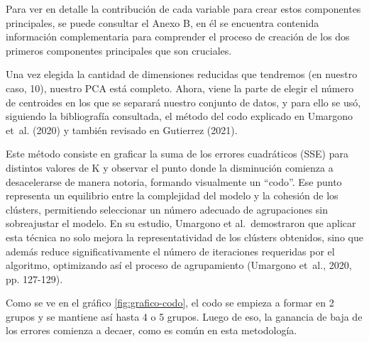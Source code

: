 \documentclass[
  12pt,
  letterpaper,
]{article}
\begin{document}
Para ver en detalle la contribución de cada variable para crear estos componentes principales, se puede consultar el Anexo B, en él se encuentra contenida información complementaria para comprender el proceso de creación de los dos primeros componentes principales que son cruciales.

Una vez elegida la cantidad de dimensiones reducidas que tendremos (en nuestro caso, 10), nuestro PCA está completo.
Ahora, viene la parte de elegir el número de centroides en los que se separará nuestro conjunto de datos, y para ello se usó, siguiendo la bibliografía consultada, el método del codo explicado en Umargono et~al. (2020) y también revisado en Gutierrez (2021).

Este método consiste en graficar la suma de los errores cuadráticos (SSE) para distintos valores de K y observar el punto donde la disminución comienza a desacelerarse de manera notoria, formando visualmente un ``codo''.
Ese punto representa un equilibrio entre la complejidad del modelo y la cohesión de los clústers, permitiendo seleccionar un número adecuado de agrupaciones sin sobreajustar el modelo.
En su estudio, Umargono et al.~demostraron que aplicar esta técnica no solo mejora la representatividad de los clústers obtenidos, sino que además reduce significativamente el número de iteraciones requeridas por el algoritmo, optimizando así el proceso de agrupamiento (Umargono et~al., 2020, pp. 127-129).

Como se ve en el gráfico \ref{fig:grafico-codo}, el codo se empieza a formar en 2 grupos y se mantiene así hasta 4 o 5 grupos.
Luego de eso, la ganancia de baja de los errores comienza a decaer, como es común en esta metodología.
\end{document}
